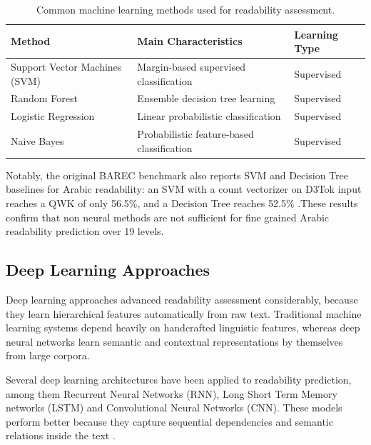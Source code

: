 \documentclass[12pt]{report}
\begin{document}
\begin{table}[H]

\centering

\caption{Common machine learning methods used for readability assessment.}

\label{tab:ml_readability}

\begin{tabular}{p{4cm} p{7cm} p{2.5cm}}

\toprule

\textbf{Method} & \textbf{Main Characteristics} & \textbf{Learning Type} \\

\midrule

Support Vector Machines (SVM) & Margin-based supervised classification & Supervised \\

Random Forest & Ensemble decision tree learning & Supervised \\

Logistic Regression & Linear probabilistic classification & Supervised \\

Naive Bayes & Probabilistic feature-based classification & Supervised \\

\bottomrule

\end{tabular}

\end{table}
Notably, the original BAREC benchmark also reports SVM and Decision Tree baselines for Arabic readability: an SVM with a count vectorizer on D3Tok input reaches a QWK of only 56.5\%, and a Decision Tree reaches 52.5\% \cite{elmadani2025barec}.These results confirm that non neural methods are not sufficient for fine grained Arabic readability prediction over 19 levels.
\subsection{Deep Learning Approaches}

Deep learning approaches advanced readability assessment considerably, because they learn hierarchical features automatically from raw text. Traditional machine learning systems depend heavily on handcrafted linguistic features, whereas deep neural networks learn semantic and contextual representations by themselves from large corpora.

Several deep learning architectures have been applied to readability prediction, among them Recurrent Neural Networks (RNN), Long Short Term Memory networks (LSTM) and Convolutional Neural Networks (CNN). These models perform better because they capture sequential dependencies and semantic relations inside the text \cite{martinc2021supervised}.
\end{document}
